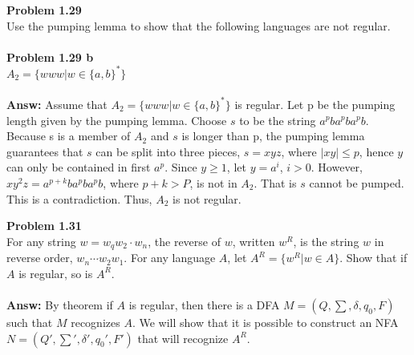 \documentclass{article}
\newcommand{\answ}[1]{\hspace{1cm}\textbf{Answ:} #1}
\newcommand{\problem}[1]{\large{\textbf{Problem #1} \\}}
\begin{document}
{{{\begin{center}
\end{center}

\problem{1.29}
Use the pumping lemma to show that the following languages are not regular. \\  \\
\problem{1.29 b} 
$A_2 = \{www| w \in \{a,b\}^*\}$\\ \\
\answ{Assume} that $A_2 = \{www| w \in \{a,b\}^*\}$ is regular. Let p be the pumping 
length given by the pumping lemma. Choose $s$ to be the string $a^pba^pba^pb$. 
Because s is a member of $A_2$ and $s$ is longer than p, the pumping lemma guarantees 
that $s$ can be split into three pieces, $s=xyz$, where $|xy| \leq p$, hence $y$ can 
only be contained in first $a^p$. Since $y \geq 1$, let $y = a^i$, $i > 0$. 
However, $xy^2z = a^{p+k}ba^pba^pb$, where $p+k > P$, is not in $A_2$. That is $s$ 
cannot be pumped. This is a contradiction. Thus, $A_2$ is not regular.

\vspace{1cm}
\problem{1.31}
For any string $ w = w_qw_2\cdot w_n$, the reverse of $w$, written $w^R$, is the string $w$ in reverse order, 
$w_n\cdots w_2 w_1$.  For any language $A$, let $A^R = \{w^R | w \in A\}$.
Show that if $A$ is regular, so is $A^R$.\\ \\
\answ{By} theorem if $A$ is regular, then there is a DFA $M = (Q,\sum, \delta, q_0, F)$ such that $M$ recognizes $A$. 
We will show that it is possible to construct
an NFA $N = (Q',\sum ', \delta ', q_0 ', F ')$ that will recognize $A^R$. \\

}}}
\end{document}
